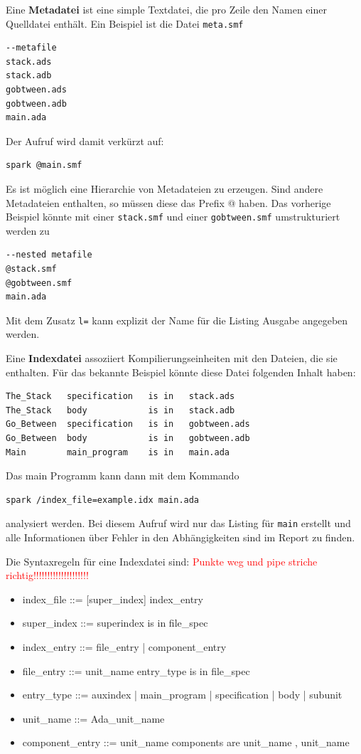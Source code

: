 Eine \textbf{Metadatei} ist eine simple Textdatei, die pro Zeile den Namen einer Quelldatei enthält. Ein Beispiel ist die Datei \texttt{meta.smf}

\begin{verbatim}
--metafile
stack.ads
stack.adb
gobtween.ads
gobtween.adb
main.ada
\end{verbatim}

Der Aufruf wird damit verkürzt auf:

\begin{verbatim}
spark @main.smf
\end{verbatim}

Es ist möglich eine Hierarchie von Metadateien zu erzeugen. Sind andere Metadateien enthalten, so müssen diese das Prefix @ haben. Das vorherige Beispiel könnte mit einer \texttt{stack.smf} und einer \texttt{gobtween.smf} umstrukturiert werden zu

\begin{verbatim}
--nested metafile
@stack.smf
@gobtween.smf
main.ada
\end{verbatim}

Mit dem Zusatz \texttt{\/l=} kann explizit der Name für die Listing Ausgabe angegeben werden.

Eine \textbf{Indexdatei} assoziiert Kompilierungseinheiten mit den Dateien, die sie enthalten. Für das bekannte Beispiel könnte diese Datei folgenden Inhalt haben:

\begin{verbatim}
The_Stack	specification	is in	stack.ads
The_Stack	body			is in	stack.adb
Go_Between	specification	is in	gobtween.ads
Go_Between	body			is in	gobtween.adb
Main		main_program	is in	main.ada
\end{verbatim}

Das main Programm kann dann mit dem Kommando
\begin{verbatim}
spark /index_file=example.idx main.ada
\end{verbatim}
analysiert werden. Bei diesem Aufruf wird nur das Listing für \texttt{main} erstellt und alle Informationen über Fehler in den Abhängigkeiten sind im Report zu finden.

Die Syntaxregeln für eine Indexdatei sind:
\textcolor{red}{Punkte weg und pipe striche richtig!!!!!!!!!!!!!!!!!!!!}
\begin{itemize}
\item index\_file ::= [super\_index] {index\_entry}
\item super\_index ::= superindex is in file\_spec
\item index\_entry ::= file\_entry | component\_entry
\item file\_entry ::= unit\_name entry\_type is in file\_spec
\item entry\_type ::= auxindex | main\_program | specification | body | subunit
\item unit\_name ::= Ada\_unit\_name
\item component\_entry ::= unit\_name components are unit\_name {, unit\_name}
\end{itemize}

